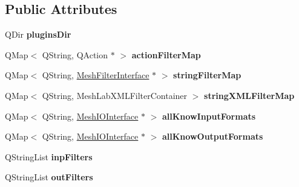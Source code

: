 \subsection*{Public Attributes}
\begin{DoxyCompactItemize}
\item 
\mbox{\label{class_plugin_manager_a99b37bafbca2da68f3214a2970288f57}} 
Q\+Dir {\bfseries plugins\+Dir}
\item 
\mbox{\label{class_plugin_manager_af30a916deae406599434b7097e4799f9}} 
Q\+Map$<$ Q\+String, Q\+Action $\ast$ $>$ {\bfseries action\+Filter\+Map}
\item 
\mbox{\label{class_plugin_manager_a6551caddba157162e61625c7a89df86a}} 
Q\+Map$<$ Q\+String, \hyperlink{class_mesh_filter_interface}{Mesh\+Filter\+Interface} $\ast$ $>$ {\bfseries string\+Filter\+Map}
\item 
\mbox{\label{class_plugin_manager_a2d780a806b2930f206e720fd105bade5}} 
Q\+Map$<$ Q\+String, Mesh\+Lab\+X\+M\+L\+Filter\+Container $>$ {\bfseries string\+X\+M\+L\+Filter\+Map}
\item 
\mbox{\label{class_plugin_manager_a2b5ba0cf85f3eedc21689845e099abe6}} 
Q\+Map$<$ Q\+String, \hyperlink{class_mesh_i_o_interface}{Mesh\+I\+O\+Interface} $\ast$ $>$ {\bfseries all\+Know\+Input\+Formats}
\item 
\mbox{\label{class_plugin_manager_a529bc903c5ab4998581cb5ec824517d9}} 
Q\+Map$<$ Q\+String, \hyperlink{class_mesh_i_o_interface}{Mesh\+I\+O\+Interface} $\ast$ $>$ {\bfseries all\+Know\+Output\+Formats}
\item 
\mbox{\label{class_plugin_manager_ac02f384c573606cfaf90d5d127094254}} 
Q\+String\+List {\bfseries inp\+Filters}
\item 
\mbox{\label{class_plugin_manager_ab800b92260ca2b85a07f7e2bc6519c69}} 
Q\+String\+List {\bfseries out\+Filters}
\item 
\mbox{\label{class_plugin_manager_a27e036e1213c914ef32cc2815f736a71}} 

\end{DoxyCompactItemize}
